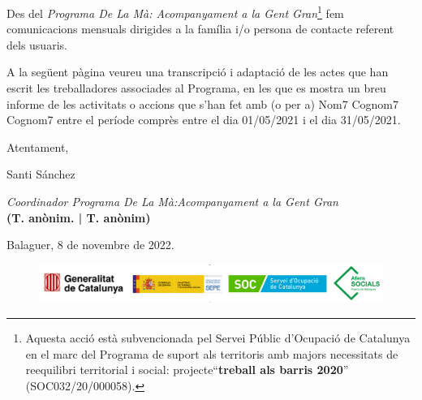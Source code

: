 \documentclass[a4paper,12pt]{elsarticle}  %
\begin{document}
Des del \textit{Programa De La Mà: Acompanyament a la Gent Gran}\footnote{Aquesta acció està subvencionada pel Servei Públic 
d'Ocupació de Catalunya en el marc del Programa de suport als territoris amb majors 
necessitats de reequilibri territorial i social: projecte``\textbf{treball als barris 2020}'' (SOC032/20/000058).} fem comunicacions mensuals
dirigides a la família i/o persona de contacte referent dels usuaris.


A la següent pàgina veureu una transcripció i adaptació de les actes que han escrit les treballadores associades
al Programa, en les que es mostra un breu informe de les activitats o accions que s'han fet amb (o per a) 
Nom7 Cognom7 Cognom7 entre el període comprès entre el dia 01/05/2021 i el dia 31/05/2021.

	\vspace{0.5cm}

\noindent Atentament,

\noindent Santi Sánchez

\noindent \textit{Coordinador Programa De La Mà:Acompanyament a la Gent Gran}\\
\textbf{(T. anònim. | T. anònim)}

	\vspace{0.5cm}

\noindent Balaguer, 8 de novembre de 2022.

	









\vfill

\FloatBarrier
\begin{figure}[h]
	\centering	
	\includegraphics[width=1\textwidth]{../IMATGES/logosGeneMinisterAferssocialsSoc.png}	
\end{figure}
\FloatBarrier	










\clearpage
\end{document}
